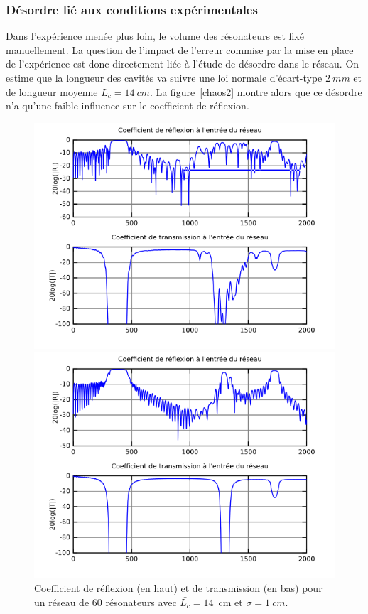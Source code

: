 \subsubsection*{Désordre lié aux conditions expérimentales} 
Dans l'expérience menée plus loin, le volume des résonateurs est fixé manuellement. La question de l'impact de l'erreur commise par la mise en place de l'expérience est donc directement liée à l'étude de désordre dans le réseau. On estime que la longueur des cavités va suivre une loi normale d'écart-type $2~mm$ et de longueur moyenne $\bar{L_c}=14~cm$. La figure~\ref{chaos2} montre alors que ce désordre n'a qu'une faible influence sur le coefficient de réflexion. 


\begin{figure}[!h]
	\begin{minipage}{0.45 \textwidth}
		\centering
		\includegraphics[scale=0.5]{./images_chp1/chaos_10mm.png}
		\caption{\label{chaos10} Coefficient de réflexion (en haut) et de transmission (en bas) pour un réseau de 60 résonateurs avec $\bar{L_c}=14$~cm et $\sigma =1~cm$.}
	\end{minipage}
\hspace{0.5cm}
	\begin{minipage}{0.45 \textwidth}
		\centering
		\includegraphics[scale=0.5]{./images_chp1/chaos_2mm.png}

\end{minipage}
\end{figure}
